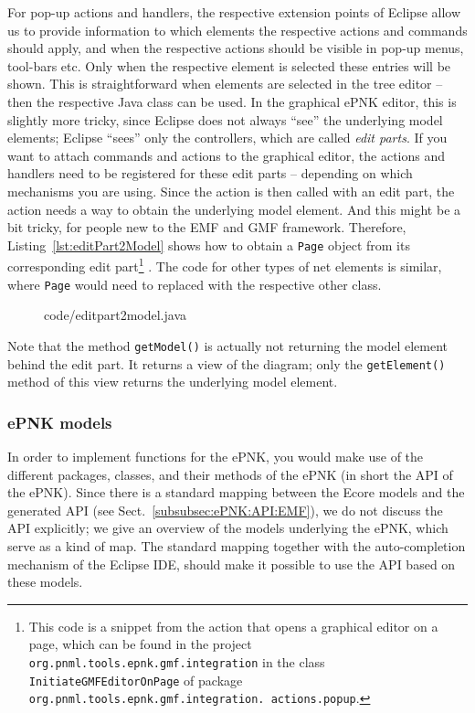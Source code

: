 For pop-up actions and handlers, the respective extension points of Eclipse allow us
to provide information to which elements the respective actions and commands should apply,
and when the respective actions should be visible in pop-up menus, tool-bars etc. Only when
the respective element is selected these entries will be shown. This is straightforward
when elements are selected in the tree editor -- then the respective Java class
can be used. In the graphical ePNK editor, this is slightly more tricky, since
Eclipse does not always ``see'' the underlying model elements; Eclipse ``sees'' only the
controllers, which are called \emph{edit parts}.%
If you want to attach commands and actions to the graphical editor, the actions
and handlers need to be registered for these edit parts -- depending on which
mechanisms you are using. Since the action is then called with an edit part,
the action needs a way to obtain the underlying model element. And this
might be a bit tricky, for people new to the EMF and GMF framework.
%
Therefore, Listing~\ref{lst:editPart2Model} shows how to obtain a {\tt Page} object from its
corresponding edit part\footnote
  {This code is a snippet from the action that opens a graphical editor on a page,
   which can be found in the project {\tt org.pnml.tools.epnk.gmf.integration}
   in the class {\tt InitiateGMFEditorOnPage} of package
   {\tt org.pnml.tools.epnk.gmf.integration. actions.popup}.}%
. The code for other types of net elements is similar,
where {\tt Page} would need to replaced with the respective other class.
%
\begin{figure}[htbp!]
%
  {code/editpart2model.java}
\end{figure}
%
Note that the method {\tt getModel()} is actually not returning the
model element behind the edit part. It returns a view of the diagram; only
the {\tt getElement()} method of this view returns the underlying model
element.


\subsubsection{ePNK models}

In order to implement functions for the ePNK, you would make use of the
different packages, classes, and their methods of the ePNK (in short the API of the ePNK).
Since there is a standard mapping between the Ecore models and the generated API (see
Sect.~\ref{subsubsec:ePNK:API:EMF}), we do not discuss the API explicitly;
we give an overview of the models underlying the ePNK, which serve as a kind
of map. The standard mapping together with the auto-completion mechanism
of the Eclipse IDE, should make it possible to use the API based on these
models.


